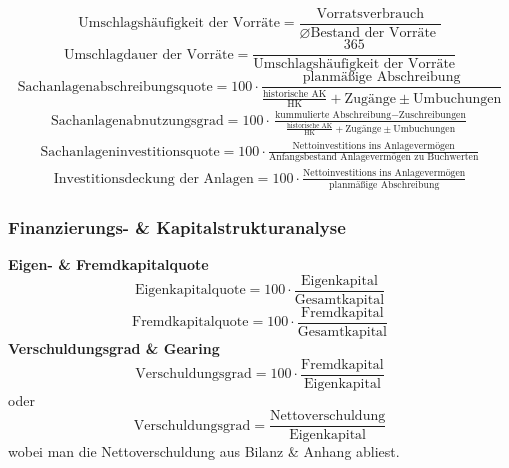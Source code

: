 \documentclass[11pt]{scrartcl}
\begin{document}
\begin{equation}
    \text{Umschlagshäufigkeit der Vorräte} = \frac{\text{Vorratsverbrauch}}{\varnothing\text{Bestand der Vorräte }}
\end{equation}
\begin{equation}
    \text{Umschlagdauer der Vorräte} = \frac{365}{\text{Umschlagshäufigkeit der Vorräte}}
\end{equation}
\begin{equation}
    \text{Sachanlagenabschreibungsquote} = 100\cdot\frac{\text{planmäßige Abschreibung}}{\frac{\text{historische AK}}{\text{HK}} + \text{Zugänge} \pm \text{Umbuchungen}}
\end{equation}
\begin{multline}
    \text{Sachanlagenabnutzungsgrad} = 100\cdot\frac{\text{kummulierte Abschreibung}-\text{Zuschreibungen}}{\frac{\text{historische AK}}{\text{HK}} + \text{Zugänge} \pm \text{Umbuchungen}}
\end{multline}
\begin{multline}
    \text{Sachanlageninvestitionsquote} = 100\cdot\frac{\text{Nettoinvestitions ins Anlagevermögen}}{\text{Anfangsbestand Anlagevermögen zu Buchwerten}}
\end{multline}
\begin{multline}
    \text{Investitionsdeckung der Anlagen} = 100\cdot\frac{\text{Nettoinvestitions ins Anlagevermögen}}{\text{planmäßige Abschreibung}}
\end{multline}
\subsubsection[]{Finanzierungs- \& Kapitalstrukturanalyse}
\textbf{Eigen- \& Fremdkapitalquote}
\begin{equation}
    \text{Eigenkapitalquote} = 100 \cdot\frac{\text{Eigenkapital}}{\text{Gesamtkapital}}
\end{equation}
\begin{equation}
    \text{Fremdkapitalquote} = 100 \cdot\frac{\text{Fremdkapital}}{\text{Gesamtkapital}}
\end{equation}
\textbf{Verschuldungsgrad \& Gearing}
\begin{equation}
    \text{Verschuldungsgrad} = 100 \cdot\frac{\text{Fremdkapital}}{\text{Eigenkapital}}
\end{equation}
oder
\begin{equation}
    \text{Verschuldungsgrad} = \frac{\text{Nettoverschuldung}}{\text{Eigenkapital}}
\end{equation}
wobei man die Nettoverschuldung aus Bilanz \& Anhang abliest. 
\end{document}
